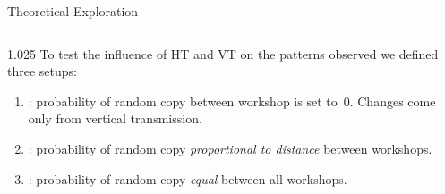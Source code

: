 \documentclass[final]{beamer}
\newlength{\onecolwid}
\newlength{\twocolwid}
\begin{document}
\begin{frame}[t]
\begin{columns}[t]
\begin{column}{\twocolwid}
\begin{block}{Theoretical Exploration}
\begin{columns}[t,totalwidth=\twocolwid]
\begin{column}{1.025\onecolwid}
%
%
%
To test the influence of HT and VT on the patterns observed we defined three setups:\\
\begin{enumerate}
    \item  {}: probability of random copy between workshop is set to~$0$. Changes come only from vertical transmission.\\
    \item {}: probability of random copy \emph{proportional to distance} between workshops. \\
    \item  {}: probability of random copy \emph{equal} between all workshops. \\
\end{enumerate}
\end{column}


\end{columns}
\end{block}
\end{column}
\end{columns}
\end{frame}
\end{document}

